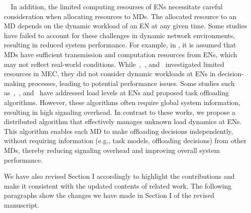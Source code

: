 \documentclass[12pt,draftclsnofoot,onecolumn]{IEEEtran}
\newenvironment{my}[2]%
{\begin{list}{}%
{\setlength{\rightmargin}{#1}\setlength{\leftmargin}{#2}}%


 \item[]{}

} {\end{list}}
\begin{document}
\begin{enumerate}
\begin{my}{1cm}{1cm}
{		
		
		
		
		
		
		\,\,\,\,
		In addition, the limited computing resourses of ENs necessitate careful consideration when allocating resources to MDs. The allocated resource to an MD depends on the dynamic workload of an EN at any given time. Some studies have failed to account for these challenges in dynamic network environments, resulting in reduced system performance. For example, in \cite{chen2021drl}, it is assumed that MDs have sufficient transmission and computation resources from ENs, which may not reflect real-world conditions. While~\cite{dai2020edge},~\cite{wu2024privacy}, and~\cite{zhao2019deep} investigated limited resources in MEC, they did not consider dynamic workloads at ENs in decision-making processes, leading to potential performance issues.
		Some studies such as~\cite{sun2024hierarchical},~\cite{gong2022edge}, and~\cite{gao2022large} have addressed load levels at ENs and proposed task offloading algorithms. However, these algorithms often require global system information, resulting in high signaling overhead. In contrast to these works, we propose a distributed algorithm that effectively manages unknown load dynamics at ENs. This algorithm enables each MD to make offloading decisions independently, without requiring information (e.g., task models, offloading decisions) from other MDs, thereby reducing signaling overhead and improving overall system performance.\vspace{2mm}
		
		
		
		
	}
\end{my}



















\vspace{6mm}

We have also revised Section I accordingly to highlight the contributions and make it consistent with the updated contents of related work. The following paragraphs show the changes we have made in Section I of the revised manuscript.


\end{enumerate}
\end{document}
